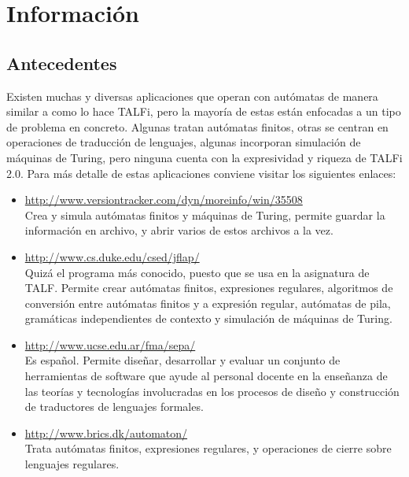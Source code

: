 \documentclass[12pt,a4paper,spanish]{book}
\newcommand{\clearemptydoublepage}{\newpage{\pagestyle{empty}
\cleardoublepage}}
\begin{document}
\clearemptydoublepage
\chapter{Informaci\'on}
\section{Antecedentes}
Existen muchas y diversas aplicaciones que operan con aut\'omatas de manera similar a como lo hace TALFi, pero la mayor\'ia de estas est\'an enfocadas a un tipo de problema en concreto.
Algunas tratan aut\'omatas finitos, otras se centran en operaciones de traducci\'on de lenguajes, algunas incorporan simulaci\'on de m\'aquinas de Turing, pero ninguna cuenta con la expresividad y riqueza de TALFi 2.0.
Para m\'as detalle de estas aplicaciones conviene visitar los siguientes enlaces:
\newline

\begin{itemize}
\item{ \noindent\url{http://www.versiontracker.com/dyn/moreinfo/win/35508} \\}
Crea y simula aut\'omatas finitos y m\'aquinas de Turing, permite guardar la informaci\'on en archivo, y abrir varios de estos archivos a la vez.
\end{itemize}
\begin{itemize}
\item{ \url{http://www.cs.duke.edu/csed/jflap/} \\}
Quiz\'a el programa m\'as conocido, puesto que se usa en la asignatura de TALF. Permite crear aut\'omatas finitos, expresiones regulares, algoritmos de conversi\'on entre aut\'omatas finitos y a expresi\'on regular, aut\'omatas de pila, gram\'aticas independientes de contexto y simulaci\'on de m\'aquinas de Turing.
\end{itemize}
\begin{itemize}
\item{ \url{http://www.ucse.edu.ar/fma/sepa/} \\}
Es espa\~{n}ol. Permite dise\~{n}ar, desarrollar y evaluar un conjunto de herramientas de software que ayude al personal docente en la ense\~{n}anza de las teor\'ias y tecnolog\'ias involucradas en los procesos de dise\~{n}o y construcci\'on de traductores de lenguajes formales.
\end{itemize}
\begin{itemize}
\item{ \url{http://www.brics.dk/automaton/} \\}
Trata aut\'omatas finitos, expresiones regulares, y operaciones de cierre sobre lenguajes regulares.
\end{itemize}
\end{document}
